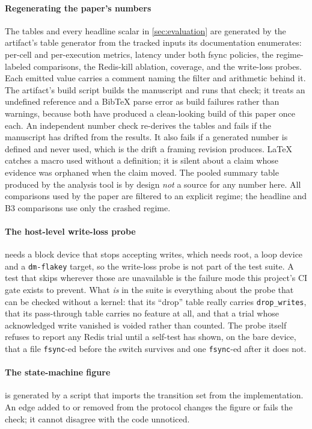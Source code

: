 \paragraph{Regenerating the paper's numbers} The tables and every headline
scalar in \cref{sec:evaluation} are generated by
the artifact's table generator from the tracked inputs its documentation
enumerates: per-cell and per-execution metrics, latency under both
fsync policies, the regime-labeled comparisons, the Redis-kill ablation,
coverage, and the write-loss probes. Each emitted value carries a comment
naming the filter and arithmetic behind it.
The artifact's build script builds the manuscript and runs that
check; it treats an undefined reference and a BibTeX parse error as build
failures rather than warnings, because both have produced a clean-looking
build of this paper once each.
An independent number check re-derives the tables and fails if
the manuscript has drifted from the results. It also fails if a generated
number is defined and never used, which is the drift a framing revision
produces.
LaTeX catches a macro used without a definition; it is silent about a claim
whose evidence was orphaned when the claim moved. The pooled summary table
produced by the analysis tool is by design \emph{not} a source for any
number here. All comparisons used by the paper are filtered to an explicit
regime; the headline and B3 comparisons use only the crashed regime.

\paragraph{The host-level write-loss probe}  needs a
block device that stops accepting writes, which needs root, a loop device and
a \texttt{dm-flakey} target, so the write-loss probe is
not part of the test suite. A test that skips wherever those are
unavailable is the failure mode this project's CI gate exists to prevent. What
\emph{is} in the suite is everything about the probe that can be checked
without a kernel: that its ``drop'' table really carries \texttt{drop\_writes},
that its pass-through table carries no feature at all, and that a trial whose
acknowledged write vanished is voided rather than counted. The probe itself
refuses to report any Redis trial until a self-test has shown, on the bare
device, that a file \texttt{fsync}-ed before the switch survives and one
\texttt{fsync}-ed after it does not.

\paragraph{The state-machine figure}  is generated by a script
that imports the transition set from the implementation. An edge added to or removed from the protocol changes the
figure or fails the check; it cannot disagree with the code unnoticed.

